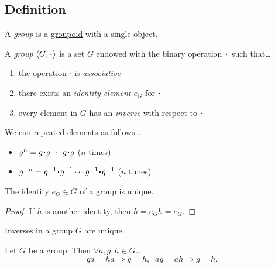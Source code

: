 \subsection{Definition}\label{groupdefinition}

A \emph{group} is a \hyperref[groupoid]{groupoid} with a single object.\newline

\noindent A \emph{group} $\langle G, \LargerCdot \rangle$ is a set $G$ endowed with the binary operation $\LargerCdot$ such that\dots
\begin{enumerate}
  \item the operation $\cdot$ is \emph{associative}
  \item there exists an \emph{identity element} $e_G$ for $\LargerCdot$
  \item every element in $G$ has an \emph{inverse} with respect to $\LargerCdot$
\end{enumerate}

\noindent We can repeated elements as follows\dots
\begin{itemize}
  \item $g^n = g \LargerCdot g \cdots g \LargerCdot g$ ($n$ times)
  \item $g^{-n} = g^{-1} \LargerCdot g^{-1} \cdots g^{-1} \LargerCdot g^{-1}$ ($n$ times)
\end{itemize} 

\begin{proposition}
The identity $e_G \in G$ of a group is unique.
\end{proposition}

\begin{proof}
If $h$ is another identity, then $h = e_Gh = e_G$.
\end{proof}

\begin{proposition}
Inverses in a group $G$ are unique.
\end{proposition}

\begin{proposition}[Cancellation]\label{cancellation}
Let $G$ be a group. Then $\forall a,g,h \in G$\dots
$$ga = ha \Rightarrow g = h, \; \; ag = ah \Rightarrow g = h.$$
\end{proposition}